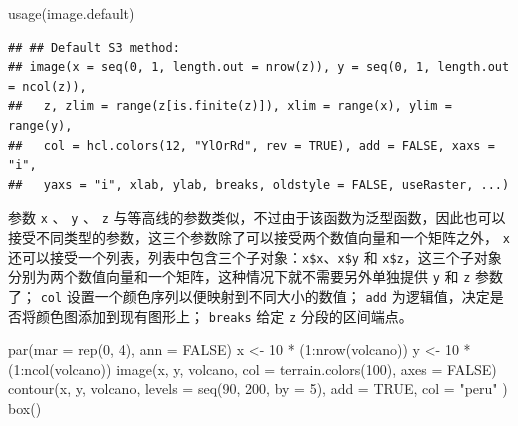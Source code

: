 \documentclass[
  b5paper,
  UTF8,twoside]{book}
\newenvironment{Shaded}{\begin{snugshade}}{\end{snugshade}}
\newcommand{\AttributeTok}[1]{\textcolor[rgb]{0.77,0.63,0.00}{#1}}
\newcommand{\ConstantTok}[1]{\textcolor[rgb]{0.00,0.00,0.00}{#1}}
\newcommand{\DecValTok}[1]{\textcolor[rgb]{0.00,0.00,0.81}{#1}}
\newcommand{\FunctionTok}[1]{\textcolor[rgb]{0.00,0.00,0.00}{#1}}
\newcommand{\NormalTok}[1]{#1}
\newcommand{\OtherTok}[1]{\textcolor[rgb]{0.56,0.35,0.01}{#1}}
\newcommand{\SpecialCharTok}[1]{\textcolor[rgb]{0.00,0.00,0.00}{#1}}
\newcommand{\StringTok}[1]{\textcolor[rgb]{0.31,0.60,0.02}{#1}}
\begin{document}
\begin{Shaded}
\begin{Highlighting}[]
\FunctionTok{usage}\NormalTok{(image.default)}
\end{Highlighting}
\end{Shaded}

\begin{verbatim}
## ## Default S3 method:
## image(x = seq(0, 1, length.out = nrow(z)), y = seq(0, 1, length.out = ncol(z)),
##   z, zlim = range(z[is.finite(z)]), xlim = range(x), ylim = range(y),
##   col = hcl.colors(12, "YlOrRd", rev = TRUE), add = FALSE, xaxs = "i",
##   yaxs = "i", xlab, ylab, breaks, oldstyle = FALSE, useRaster, ...)
\end{verbatim}

参数 \texttt{x} 、 \texttt{y} 、 \texttt{z} 与等高线的参数类似，不过由于该函数为泛型函数，因此也可以接受不同类型的参数，这三个参数除了可以接受两个数值向量和一个矩阵之外， \texttt{x} 还可以接受一个列表，列表中包含三个子对象：\texttt{x\$x}、\texttt{x\$y} 和 \texttt{x\$z}，这三个子对象分别为两个数值向量和一个矩阵，这种情况下就不需要另外单独提供 \texttt{y} 和 \texttt{z} 参数了； \texttt{col} 设置一个颜色序列以便映射到不同大小的数值； \texttt{add} 为逻辑值，决定是否将颜色图添加到现有图形上； \texttt{breaks} 给定 \texttt{z} 分段的区间端点。





\begin{Shaded}
\begin{Highlighting}[]
\FunctionTok{par}\NormalTok{(}\AttributeTok{mar =} \FunctionTok{rep}\NormalTok{(}\DecValTok{0}\NormalTok{, }\DecValTok{4}\NormalTok{), }\AttributeTok{ann =} \ConstantTok{FALSE}\NormalTok{)}
\NormalTok{x }\OtherTok{\textless{}{-}} \DecValTok{10} \SpecialCharTok{*}\NormalTok{ (}\DecValTok{1}\SpecialCharTok{:}\FunctionTok{nrow}\NormalTok{(volcano))}
\NormalTok{y }\OtherTok{\textless{}{-}} \DecValTok{10} \SpecialCharTok{*}\NormalTok{ (}\DecValTok{1}\SpecialCharTok{:}\FunctionTok{ncol}\NormalTok{(volcano))}
\FunctionTok{image}\NormalTok{(x, y, volcano, }\AttributeTok{col =} \FunctionTok{terrain.colors}\NormalTok{(}\DecValTok{100}\NormalTok{), }\AttributeTok{axes =} \ConstantTok{FALSE}\NormalTok{)}
\FunctionTok{contour}\NormalTok{(x, y, volcano,}
  \AttributeTok{levels =} \FunctionTok{seq}\NormalTok{(}\DecValTok{90}\NormalTok{, }\DecValTok{200}\NormalTok{, }\AttributeTok{by =} \DecValTok{5}\NormalTok{),}
  \AttributeTok{add =} \ConstantTok{TRUE}\NormalTok{, }\AttributeTok{col =} \StringTok{"peru"}
\NormalTok{)}
\FunctionTok{box}\NormalTok{()}
\end{Highlighting}
\end{Shaded}
\end{document}
